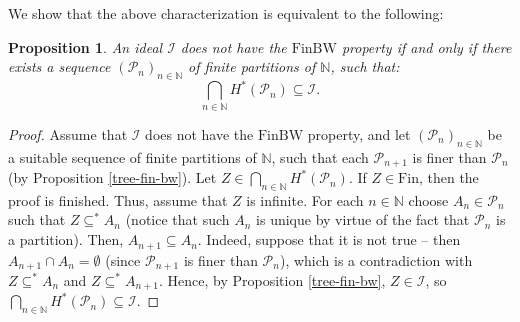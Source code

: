 \documentclass{amsart}
\newtheorem{prop}[thm]{Proposition}
\theoremstyle{definition}
\theoremstyle{definition}
\newcommand{\N}{{\mathbb N}}
\newcommand{\Fin}{\textrm{Fin}}
\newcommand{\I}{\mathcal I}
\newcommand{\finbw}{\text{FinBW}}
\begin{document}
We show that the above characterization is equivalent to the following:

\begin{prop}
An ideal $\I$ does not have the $\finbw$ property if and only if there exists a sequence $(\mathcal{P}_n)_{n\in\N}$ of finite partitions of $\N$, such that: 
$$\bigcap_{n\in\N}{H^{*}(\mathcal{P}_n)}\subseteq\I.$$
\end{prop}

\begin{proof}
Assume that $\I$ does not have the $\finbw$ property, and let $(\mathcal{P}_n)_{n\in\N}$ be a suitable sequence of finite partitions of $\N$, such that each $\mathcal{P}_{n+1}$ is finer than $\mathcal{P}_n$
(by Proposition \ref{tree-fin-bw}). Let $Z \in \bigcap_{n\in\N}{H^{*}(\mathcal{P}_n)}$. If $Z\in\Fin$, then the proof is finished. Thus, assume that $Z$ is infinite. For each $n\in\N$ choose $A_n\in \mathcal{P}_n$ such that $Z \subseteq^* A_n$ (notice that such $A_n$ is unique by virtue of the fact that $\mathcal{P}_n$ is a partition). Then, $A_{n+1} \subseteq A_n$. Indeed, suppose that it is not true -- then $A_{n+1} \cap A_n = \emptyset$ (since $\mathcal{P}_{n+1}$ is finer than $\mathcal{P}_n$), which is a contradiction with $Z \subseteq^* A_n$ and $Z \subseteq^* A_{n+1}$. Hence, by Proposition \ref{tree-fin-bw}, $Z\in\I$, so $\bigcap_{n\in\N}{H^{*}(\mathcal{P}_n)} \subseteq \I$.


\end{proof}
\end{document}
